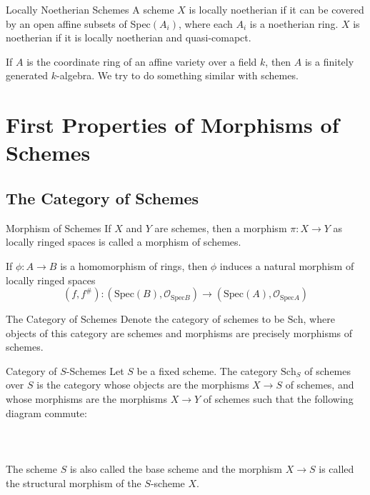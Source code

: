 \documentclass[a4paper]{article}
\begin{document}
\begin{defn}{Locally Noetherian Schemes}{} A scheme $X$ is locally noetherian if it can be covered by an open affine subsets of Spec$(A_i)$, where each $A_i$ is a noetherian ring. $X$ is noetherian if it is locally noetherian and quasi-comapct. 
\end{defn}

If $A$ is the coordinate ring of an affine variety over a field $k$, then $A$ is a finitely generated $k$-algebra. We try to do something similar with schemes. 

\pagebreak
\section{First Properties of Morphisms of Schemes}
\subsection{The Category of Schemes}
\begin{defn}{Morphism of Schemes}{} If $X$ and $Y$ are schemes, then a morphism $\pi:X\to Y$ as locally ringed spaces is called a morphism of schemes. 
\end{defn}

\begin{prp}{}{} If $\phi:A\to B$ is a homomorphism of rings, then $\phi$ induces a natural morphism of locally ringed spaces $$(f,f^\#):(\text{Spec}(B),\mathcal{O}_{\text{Spec}B})\to(\text{Spec}(A),\mathcal{O}_{\text{Spec}A})$$
\end{prp}

\begin{defn}{The Category of Schemes}{} Denote the category of schemes to be $\text{Sch}$, where objects of this category are schemes and morphisms are precisely morphisms of schemes. 
\end{defn}

\begin{defn}{Category of $S$-Schemes}{} Let $S$ be a fixed scheme. The category $\text{Sch}_S$ of schemes over $S$ is the category whose objects are the morphisms $X\to S$ of schemes, and whose morphisms are the morphisms $X\to Y$ of schemes such that the following diagram commute: \\~\\
\\~\\
The scheme $S$ is also called the base scheme and the morphism $X\to S$ is called the structural morphism of the $S$-scheme $X$. 
\end{defn}
\end{document}
